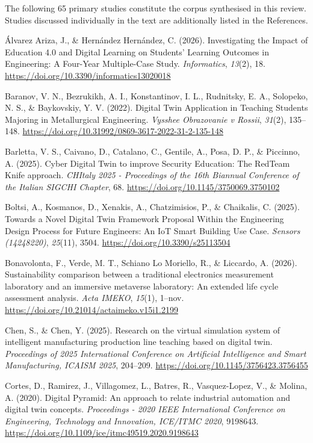 
The following 65 primary studies constitute the corpus synthesised in this review. Studies discussed individually in the text are additionally listed in the References.

Álvarez Ariza, J., \& Hernández Hernández, C. (2026). Investigating the
Impact of Education 4.0 and Digital Learning on Students' Learning
Outcomes in Engineering: A Four-Year Multiple-Case Study. \emph{Informatics},
\emph{13}(2), 18. \url{https://doi.org/10.3390/informatics13020018}

Baranov, V. N., Bezrukikh, A. I., Konstantinov, I. L., Rudnitsky, E. A.,
Solopeko, N. S., \& Baykovskiy, Y. V. (2022). Digital Twin Application in
Teaching Students Majoring in Metallurgical Engineering. \emph{Vysshee
Obrazovanie v Rossii}, \emph{31}(2), 135--148.
\url{https://doi.org/10.31992/0869-3617-2022-31-2-135-148}

Barletta, V. S., Caivano, D., Catalano, C., Gentile, A., Posa, D. P., \&
Piccinno, A. (2025). Cyber Digital Twin to improve Security Education:
The RedTeam Knife approach. \emph{CHItaly 2025 - Proceedings of the 16th
Biannual Conference of the Italian SIGCHI Chapter}, 68.
\url{https://doi.org/10.1145/3750069.3750102}

Boltsi, A., Kosmanos, D., Xenakis, A., Chatzimisios, P., \& Chaikalis, C.
(2025). Towards a Novel Digital Twin Framework Proposal Within the
Engineering Design Process for Future Engineers: An IoT Smart Building
Use Case. \emph{Sensors (14248220)}, \emph{25}(11), 3504.
\url{https://doi.org/10.3390/s25113504}

Bonavolonta, F., Verde, M. T., Schiano Lo Moriello, R., \& Liccardo, A.
(2026). Sustainability comparison between a traditional electronics
measurement laboratory and an immersive metaverse laboratory: An
extended life cycle assessment analysis. \emph{Acta IMEKO}, \emph{15}(1), 1--nov.
\url{https://doi.org/10.21014/actaimeko.v15i1.2199}

Chen, S., \& Chen, Y. (2025). Research on the virtual simulation system
of intelligent manufacturing production line teaching based on digital
twin. \emph{Proceedings of 2025 International Conference on Artificial
Intelligence and Smart Manufacturing, ICAISM 2025}, 204--209.
\url{https://doi.org/10.1145/3756423.3756455}

Cortes, D., Ramirez, J., Villagomez, L., Batres, R., Vasquez-Lopez, V.,
\& Molina, A. (2020). Digital Pyramid: An approach to relate industrial
automation and digital twin concepts. \emph{Proceedings - 2020 IEEE
International Conference on Engineering, Technology and Innovation,
ICE/ITMC 2020}, 9198643.
\url{https://doi.org/10.1109/ice/itmc49519.2020.9198643}

